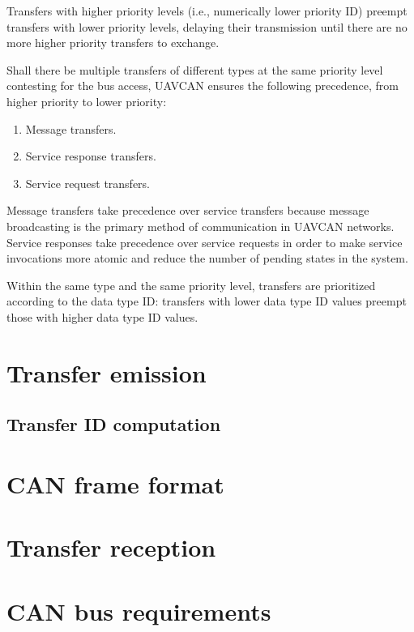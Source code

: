 Transfers with higher priority levels (i.e., numerically lower priority ID)
preempt transfers with lower priority levels, delaying their transmission
until there are no more higher priority transfers to exchange.

Shall there be multiple transfers of different types at the same priority level contesting for the bus access,
UAVCAN ensures the following precedence, from higher priority to lower priority:

\begin{enumerate}
    \item Message transfers.
    \item Service response transfers.
    \item Service request transfers.
\end{enumerate}

Message transfers take precedence over service transfers because message broadcasting is the primary method of
communication in UAVCAN networks.
Service responses take precedence over service requests in order to make service invocations more atomic
and reduce the number of pending states in the system.

Within the same type and the same priority level,
transfers are prioritized according to the data type ID:
transfers with lower data type ID values preempt those with higher data type ID values.

\section{Transfer emission}

\subsection{Transfer ID computation}




\section{CAN frame format}

\section{Transfer reception}

\section{CAN bus requirements}



